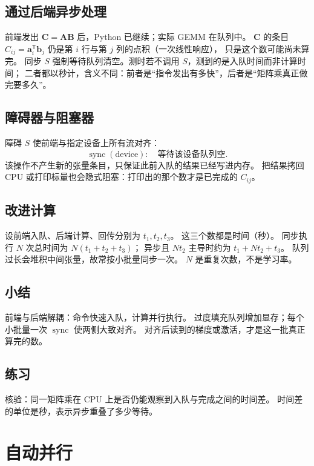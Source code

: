 \subsection{通过后端异步处理}

前端发出 $\bm{C}=\bm{A}\bm{B}$ 后，Python 已继续；实际 GEMM 在队列中。
$\bm{C}$ 的条目 $C_{ij}=\bm{a}_i^{\mathsf T}\bm{b}_j$ 仍是第 $i$ 行与第 $j$ 列的点积（一次线性响应），
只是这个数可能尚未算完。
同步 $S$ 强制等待队列清空。测时若不调用 $S$，测到的是入队时间而非计算时间；
二者都以秒计，含义不同：前者是“指令发出有多快”，后者是“矩阵乘真正做完要多久”。

\subsection{障碍器与阻塞器}

障碍 $S$ 使前端与指定设备上所有流对齐：
\[
\operatorname{sync}(\text{device}):
\quad
\text{等待该设备队列空}.
\]
该操作不产生新的张量条目，只保证此前入队的结果已经写进内存。
把结果拷回 CPU 或打印标量也会隐式阻塞：打印出的那个数才是已完成的 $C_{ij}$。

\subsection{改进计算}

设前端入队、后端计算、回传分别为 $t_1,t_2,t_3$。
这三个数都是时间（秒）。
同步执行 $N$ 次总时间为 $N(t_1+t_2+t_3)$；
异步且 $Nt_2$ 主导时约为 $t_1+N t_2+t_3$。
队列过长会堆积中间张量，故常按小批量同步一次。
$N$ 是重复次数，不是学习率。

\subsection{小结}

前端与后端解耦：命令快速入队，计算并行执行。
过度填充队列增加显存；每个小批量一次 $\operatorname{sync}$ 使两侧大致对齐。
对齐后读到的梯度或激活，才是这一批真正算完的数。

\subsection{练习}

核验：同一矩阵乘在 CPU 上是否仍能观察到入队与完成之间的时间差。
时间差的单位是秒，表示异步重叠了多少等待。

\section{自动并行}

